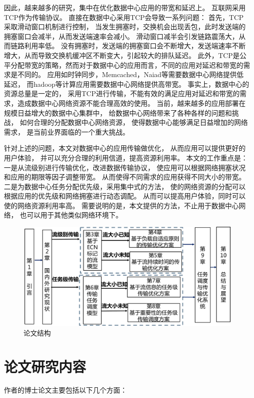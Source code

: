 因此，越来越多的研究，集中在优化数据中心应用的带宽和延迟上。
互联网采用TCP作为传输协议。
直接在数据中心采用TCP会导致一系列问题：
首先，TCP采取滑动窗口机制进行控制，
当发生拥塞时，交换机会出现丢包，此时发送端的拥塞窗口会减半，从而发送端速率会减小。
滑动窗口减半会引发链路震荡大，从而链路利用率低。
没有拥塞时，发送端的拥塞窗口会不断增大，发送端速率不断增大，从而导致交换机缓冲区不断变大，引起较大的排队延迟。
此外，TCP是公平分配带宽的策略，然而对于数据中心的应用而言，不同的应用对延迟和带宽的需求是不同的。
应用如时钟同步，Memcached，Naiad等需要数据中心网络提供低延迟，
而hadoop等计算应用需要数据中心网络提供高带宽。
事实上，数据中心的资源总量是一定的，
采用TCP进行传输，不能有效的满足应用对延迟和带宽的需求，造成数据中心网络资源不能合理高效的使用。
当前，越来越多的应用部署在规模日益增大的数据中心集群中，
给数据中心网络带来了各种各样的问题和挑战，
如何合理的分配数据中心网络资源，
使得数据中心能够满足日益增加的网络需求，
是当前业界面临的一个重大挑战。


针对上述的问题，本文对数据中心的应用传输做优化，
从而应用可以提供更好的用户体验，
并可以充分合理的利用信道，提高资源利用率。
本文的工作重点是：一是从流级别进行传输优化，改进数据传输协议，
使应用可以根据网络拥塞状况和应用的期限等因子调整带宽。
从而使得不同需求的应用获得不同大小的带宽。
二是为数据中心任务分配优先级，采用集中式的方法，
使的网络资源的分配可以根据应用的优先级和网络拥塞进行动态调配。
从而可以提高用户体验，同时可以使的网络资源利用率高。
需要说明的是，本文提供的方法，不止用于数据中心网络，
也可以用于其他类似网络环境下。
\label{cha:LPD}
\begin{figure}[b]
\begin{center}
\includegraphics [width=0.9\columnwidth] {figures/structure.pdf}
\caption{论文结构}
\label{paper-structure-fig}
\end{center}
\end{figure}


\section{论文研究内容}
作者的博士论文主要包括以下几个方面：

